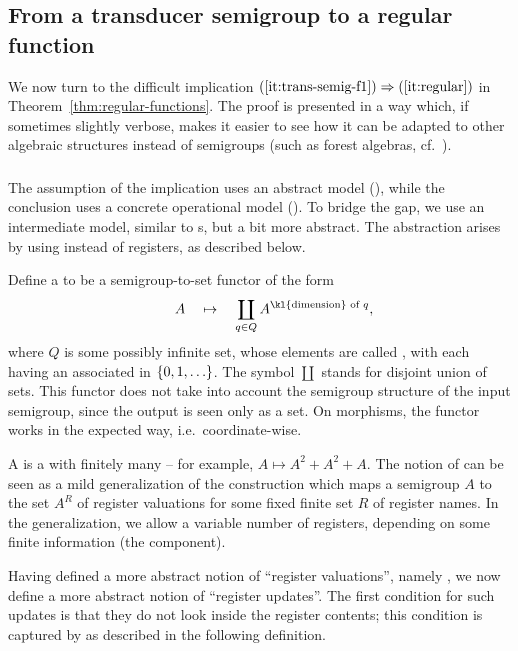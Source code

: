 \subsection{From a transducer semigroup to a regular function}
\label{sec:hard}
We now turn to the difficult implication $(\ref{it:trans-semig-f1}) \Rightarrow (\ref{it:regular})$ in Theorem~\ref{thm:regular-functions}. 
 The proof is presented in a way which, if sometimes slightly verbose, makes it
 easier to see how it can be adapted to other algebraic structures instead of
 semigroups (such as forest algebras, cf.~).

\subsubsection{}
\label{sec:abstract-sst} 
The assumption of the implication uses an abstract model (), while the conclusion uses a concrete operational model (). To bridge the gap, we use an intermediate model, similar to \sst{}s, but a bit more abstract. The abstraction arises by using  instead of registers, as described below. 

\AP Define a  to be a semigroup-to-set functor of the form
\begin{align*}
\qquad A \quad \mapsto \quad \coprod_{q \in Q} A^{\text{\kl{dimension} of } q},
\end{align*}
where $Q$ is some possibly infinite set, whose elements are called , with each  having an associated  in $\{0,1,\ldots\}$. The symbol $\coprod$ stands for disjoint union of sets. This functor does not take into account the semigroup structure of the input semigroup, since the output is seen only as a set.
On morphisms, the functor works in the expected way, i.e.~coordinate-wise.  

\AP A  is a  with finitely many  -- for example, $A \mapsto A^2 + A^2 + A$. 
The notion of  can be seen as a mild generalization of the construction which maps a semigroup $A$ to the set $A^R$ of register valuations for some fixed finite set $R$ of register names.  In the generalization, we allow a variable number of registers, depending on some finite information (the component). 

Having defined a more abstract notion of \enquote{register valuations}, namely , we now define a more abstract notion of \enquote{register updates}. The first condition for such updates is that they do not look inside the register contents; this condition is captured by  as described in the following definition. 



